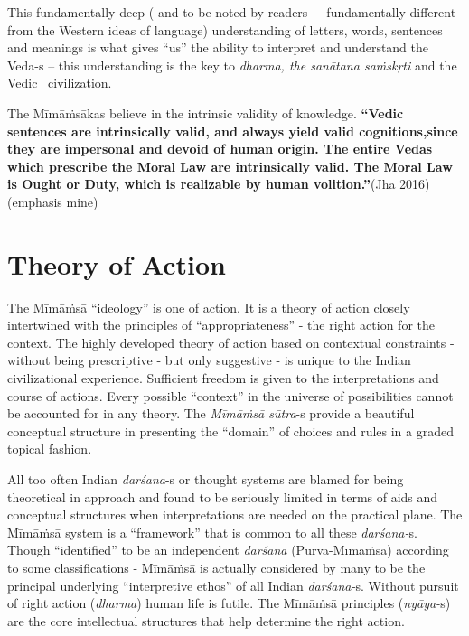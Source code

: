 This fundamentally deep ( and to be noted by readers  - fundamentally different from the Western ideas of language) understanding of letters, words, sentences and meanings is what gives “us” the ability to interpret and understand the Veda-s – this understanding is the key to \textit{dharma, the sanātana saṁskṛti} and the Vedic  civilization.

\begin{myquote}
The Mīmāṁsākas believe in the intrinsic validity of knowledge. \textbf{“Vedic sentences are intrinsically valid, and always yield valid cognitions,since they are impersonal and devoid of human origin. The entire Vedas which prescribe the Moral Law are intrinsically valid. The Moral Law is Ought or Duty, which is realizable by human volition.”}\hfill (Jha 2016) (emphasis mine)
\end{myquote}


\section*{Theory of Action}

The Mīmāṁsā “ideology” is one of action. It is a theory of action closely intertwined with the principles of “appropriateness” - the right action for the context. The highly developed theory of action based on contextual constraints - without being prescriptive - but only suggestive - is unique to the Indian civilizational experience. Sufficient freedom is given to the interpretations and course of actions. Every possible “context” in the universe of possibilities cannot be accounted for in any theory. The \textit{Mīmāṁsā sūtra}-s provide a beautiful conceptual structure in presenting the “domain” of choices and rules in a graded topical fashion.

All too often Indian \textit{darśana}-s or thought systems are blamed for being theoretical in approach and found to be seriously limited in terms of aids and conceptual structures when interpretations are needed on the practical plane. The Mīmāṁsā system is a “framework” that is common to all these \textit{darśana-}s. Though “identified” to be an independent \textit{darśana} (Pūrva-Mīmāṁsā) according to some classifications - Mīmāṁsā is actually considered by many to be the principal underlying “interpretive ethos” of all Indian \textit{darśana-}s. Without pursuit of right action (\textit{dharma}) human life is futile. The Mīmāṁsā principles (\textit{nyāya-}s) are the core intellectual structures that help determine the right action.


